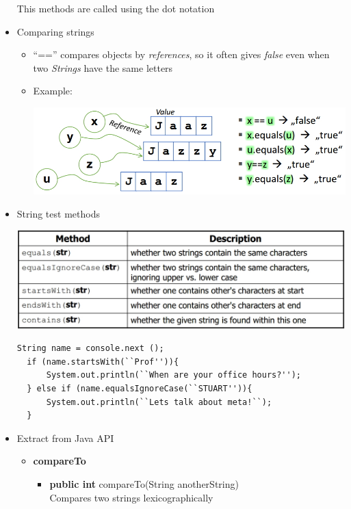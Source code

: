\documentclass[a4paper]{article}
\begin{document}
\begin{itemize}
\begin{center}
      \end{center}
      This methods are called using the dot notation
  \item Comparing strings
    \begin{itemize}
      \item ``=='' compares objects by \textit{references}, so it often gives \textit{false} even when two \textit{Strings} have the same letters
      \item Example:\\
      \begin{center}
        \includegraphics[scale=1.2]{Figures/StringExample.jpg}
      \end{center}
    \end{itemize}
  \item String test methods
    \begin{center}
      \includegraphics[scale=1]{Figures/StringTestMethods.jpg}
    \end{center}
  \begin{lstlisting}
String name = console.next ();
  if (name.startsWith(``Prof'')){
      System.out.println(``When are your office hours?'');
  } else if (name.equalsIgnoreCase(``STUART'')){
      System.out.println(``Lets talk about meta!``);
  }
  \end{lstlisting}
  \item Extract from Java API
    \begin{itemize}
      \item \textbf{compareTo}
        \begin{itemize}
          \item \textbf{public int} compareTo(String anotherString)\\Compares two strings lexicographically

\end{itemize}
\end{itemize}
\end{itemize}
\end{document}
